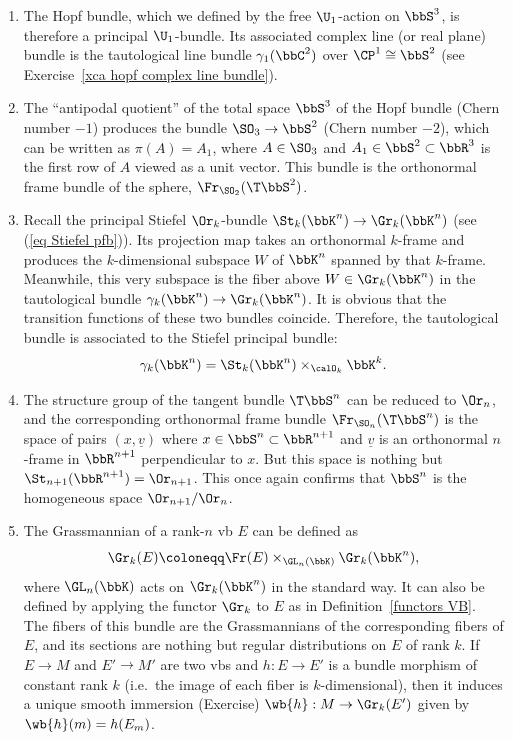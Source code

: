 \begin{example}
\begin{enumerate}
        \item The Hopf bundle, which we defined by the free $\U_1$-action on $\bbS^3$, is therefore a principal $\U_1$-bundle. Its associated complex line (or real plane) bundle is the tautological line bundle $\gamma_1(\bbC^2)$ over $\CP^1\cong\bbS^2$ (see Exercise~\ref{xca hopf complex line bundle}).
        
        \item The ``antipodal quotient'' of the total space $\bbS^3$ of the Hopf bundle (Chern number $-1$) produces the bundle $\SO_3\to \bbS^2$ (Chern number $-2$), which can be written as $\pi(A)=A_1$, where $A\in\SO_3$ and $A_1\in \bbS^2\subset \bbR^3$ is the first row of $A$ viewed as a unit vector. This bundle is the orthonormal frame bundle of the sphere, $\Fr_{\SO_2}(\T\bbS^2)$.
        
        \item Recall the principal Stiefel $\Or_k$-bundle $\St_k(\bbK^n)\to \Gr_k(\bbK^n)$ (see (\ref{eq Stiefel pfb})). Its projection map takes an orthonormal $k$-frame and produces the $k$-dimensional subspace $W$ of $\bbK^n$ spanned by that $k$-frame. Meanwhile, this very subspace is the fiber above $W\in \Gr_k(\bbK^n)$ in the tautological bundle $\gamma_k(\bbK^n)\to \Gr_k(\bbK^n)$. It is obvious that the transition functions of these two bundles coincide. Therefore, the tautological bundle is associated to the Stiefel principal bundle:
        \[\gamma_k(\bbK^n)=\St_k(\bbK^n)\times_{\calO_k}\bbK^k.\]

        \item The structure group of the tangent bundle $\T\bbS^n$ can be reduced to $\Or_n$, and the corresponding orthonormal frame bundle $\Fr_{\SO_n}(\T\bbS^n)$ is the space of pairs $(x,\underline{v})$ where $x\in\bbS^n\subset\bbR^{n+1}$ and $\underline{v}$ is an orthonormal $n$-frame in $\bbR^{n+1}$ perpendicular to $x$. But this space is nothing but $\St_{n+1}(\bbR^{n+1})=\Or_{n+1}$. This once again confirms that $\bbS^n$ is the homogeneous space $\Or_{n+1}\slash \Or_n$.

        \item The Grassmannian of a rank-$n$ \gls{vb} $E$ can be defined as 
        \[\Gr_k(E)\coloneqq \Fr(E)\times_{\GL_n(\bbK)} \Gr_k(\bbK^n),\]
        where $\GL_n(\bbK)$ acts on $\Gr_k(\bbK^n)$ in the standard way. It can also be defined by applying the functor $\Gr_k$ to $E$ as in Definition~\ref{functors VB}. The fibers of this bundle are the Grassmannians of the corresponding fibers of $E$, and its sections are nothing but regular distributions on $E$ of rank $k$.  If $E\to M$ and $E'\to M'$ are two \glspl{vb} and $h:E\to E'$ is a bundle morphism of constant rank $k$ (i.e.\ the image of each fiber is $k$-dimensional), then it induces a unique smooth immersion (Exercise) $\wb{h}:M\to \Gr_k(E')$ given by $\wb{h}(m)=h(E_m)$.
        

\end{enumerate}
\end{example}
